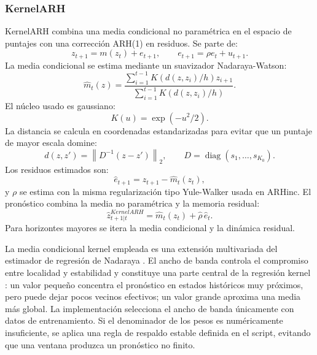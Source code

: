 \documentclass[a4paper,11pt]{article}
\newcommand{\norm}[1]{\left\lVert #1 \right\rVert}
\begin{document}
\subsubsection{KernelARH}

KernelARH combina una media condicional no paramétrica en el espacio de puntajes con una corrección ARH(1) en residuos. Se parte de:
\[
  z_{t+1}=m(z_t)+e_{t+1},
  \qquad
  e_{t+1}=\rho e_t+u_{t+1}.
\]
La media condicional se estima mediante un suavizador Nadaraya-Watson:
\[
  \widehat m_t(z)
  =
  \frac{\sum_{i=1}^{t-1}K(d(z,z_i)/h)z_{i+1}}
       {\sum_{i=1}^{t-1}K(d(z,z_i)/h)}.
\]
El núcleo usado es gaussiano:
\[
  K(u)=\exp(-u^2/2).
\]
La distancia se calcula en coordenadas estandarizadas para evitar que un puntaje de mayor escala domine:
\[
  d(z,z')=\norm{D^{-1}(z-z')}_2,
  \qquad
  D=\operatorname{diag}(s_1,\ldots,s_{K_0}).
\]
Los residuos estimados son:
\[
  \widehat e_{t+1}=z_{t+1}-\widehat m_t(z_t),
\]
y \(\rho\) se estima con la misma regularización tipo Yule-Walker usada en ARHinc. El pronóstico combina la media no paramétrica y la memoria residual:
\[
  \widehat z_{t+1|t}^{KernelARH}
  =
  \widehat m_t(z_t)+\widehat\rho\,\widehat e_t.
\]
Para horizontes mayores se itera la media condicional y la dinámica residual.

La media condicional kernel empleada es una extensión multivariada del estimador de regresión de Nadaraya \cite{Nadaraya1964}. El ancho de banda controla el compromiso entre localidad y estabilidad y constituye una parte central de la regresión kernel \cite{Tsybakov1988}: un valor pequeño concentra el pronóstico en estados históricos muy próximos, pero puede dejar pocos vecinos efectivos; un valor grande aproxima una media más global. La implementación selecciona el ancho de banda únicamente con datos de entrenamiento. Si el denominador de los pesos es numéricamente insuficiente, se aplica una regla de respaldo estable definida en el script, evitando que una ventana produzca un pronóstico no finito.
\end{document}
